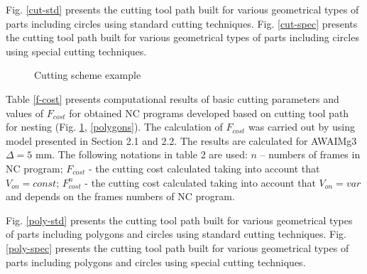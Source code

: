\documentclass[runningheads]{llncs}
\begin{document}
Fig. \ref{cut-std} presents the cutting tool path
built for various geometrical types of parts including circles using standard cutting techniques.
Fig. \ref{cut-spec} presents the cutting tool path built for various geometrical types of parts
including circles using special cutting techniques.

\begin{figure}
  \centering
  \caption{Cutting scheme example}
  \label{cutting}
\end{figure}

Table \ref{f-cost} presents computational results of basic cutting parameters and values of $F_{cost}$
for obtained NC programs developed based on cutting tool path for nesting
(Fig. \ref{cutting}, \ref{polygons}).
The calculation of $F_{cost}$
was carried out by using model presented in Section 2.1 and 2.2.
The results are calculated for AWAIMg3 $\Delta = 5$ mm.
The following notations in table 2 are used:
$n$ – numbers of frames in NC program;
$F_{cost}$ - the cutting cost calculated taking into account that $V_{on}=const$;
$F^n_{cost}$ - the cutting cost calculated taking into account that $V_{on}=var$  and depends on the frames numbers of NC program.

Fig. \ref{poly-std}
presents the cutting tool path built for various geometrical types of parts
including polygons and circles using standard cutting techniques.
Fig. \ref{poly-spec} presents the cutting tool path built for various geometrical types of parts
including polygons and circles using special cutting techniques.
\end{document}
